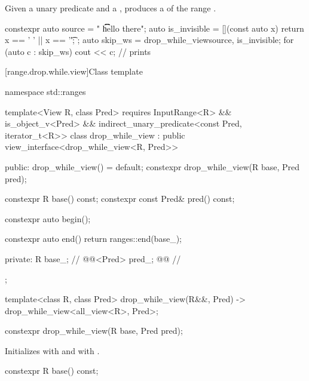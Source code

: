 \pnum
Given a unary predicate  and a  ,
 produces a 
of the range .

\pnum
\begin{example}
\begin{codeblock}
constexpr auto source = "  \t   \t   \t   hello there";
auto is_invisible = [](const auto x) { return x == ' ' || x == '\t'; };
auto skip_ws = drop_while_view{source, is_invisible};
for (auto c : skip_ws) {
  cout << c;                                    // prints 
}
\end{codeblock}
\end{example}

[range.drop.while.view]{Class template }

%
\begin{codeblock}
namespace std::ranges {
  template<View R, class Pred>
  requires InputRange<R> && is_object_v<Pred> &&
    indirect_unary_predicate<const Pred, iterator_t<R>>
  class drop_while_view : public view_interface<drop_while_view<R, Pred>> {
  public:
    drop_while_view() = default;
    constexpr drop_while_view(R base, Pred pred);

    constexpr R base() const;
    constexpr const Pred& pred() const;

    constexpr auto begin();

    constexpr auto end()
    { return ranges::end(base_); }

  private:
    R base_;                                            // \expos
    @@<Pred> pred_; @\itcorr[-1]@                       // \expos
  };

  template<class R, class Pred>
    drop_while_view(R&&, Pred) -> drop_while_view<all_view<R>, Pred>;
}
\end{codeblock}

%
\begin{itemdecl}
constexpr drop_while_view(R base, Pred pred);
\end{itemdecl}

\begin{itemdescr}
\pnum
\effects
Initializes  with  and
 with .
\end{itemdescr}

%
\begin{itemdecl}
constexpr R base() const;
\end{itemdecl}

